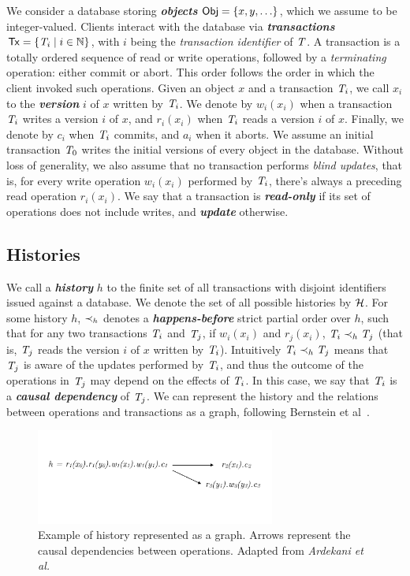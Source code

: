 We consider a database storing \textbf{\em objects} ${\sf Obj} = \{x, y, \ldots\}$, which we assume to be integer-valued. Clients interact with the database via \textbf{\em transactions} ${\sf Tx} = \{\mathit{T}_i \mid i \in \mathbb{N}\}$, with $i$ being the \emph{transaction identifier} of $\mathit{T}$. A transaction is a totally ordered sequence of read or write operations, followed by a \emph{terminating} operation: either commit or abort. This order follows the order in which the client invoked such operations. Given an object $x$ and a transaction $\mathit{T}_i$, we call $x_i$ to the \textbf{\em version} $i$ of $x$ written by $\mathit{T}_i$. We denote by $w_i(x_i)$ when a transaction $\mathit{T}_i$ writes a version $i$ of $x$, and $r_i(x_i)$ when $\mathit{T}_i$ reads a version $i$ of $x$. Finally, we denote by $c_i$ when $\mathit{T}_i$ commits, and $a_i$ when it aborts. We assume an initial transaction $\mathit{T}_0$ writes the initial versions of every object in the database. Without loss of generality, we also assume that no transaction performs \emph{blind updates}, that is, for every write operation $w_i(x_i)$ performed by $\mathit{T}_i$, there's always a preceding read operation $r_i(x_i)$. We say that a transaction is \textbf{\em read-only} if its set of operations does not include writes, and \textbf{\em update} otherwise.

\subsection{Histories}

We call a \textbf{\em history} $h$ to the finite set of all transactions with disjoint identifiers issued against a database. We denote the set of all possible histories by $\mathcal{H}$. For some history $h$, $\prec_h$ denotes a \textbf{\em happens-before} strict partial order over $h$, such that for any two transactions $\mathit{T}_i$ and $\mathit{T}_j$, if $w_i(x_i)$ and $r_j(x_i)$, $\mathit{T}_i \prec_h \mathit{T}_j$ (that is, $\mathit{T}_j$ reads the version $i$ of $x$ written by $\mathit{T}_i$). Intuitively $\mathit{T}_i \prec_h \mathit{T}_j$ means that $\mathit{T}_j$ is aware of the updates performed by $\mathit{T}_i$, and thus the outcome of the operations in $\mathit{T}_j$ may depend on the effects of $\mathit{T}_i$. In this case, we say that $\mathit{T}_i$ is a \textbf{\em causal dependency} of $\mathit{T}_j$. We can represent the history and the relations between operations and transactions as a graph, following Bernstein et al~\citep{bernstein_concurrency}.

\begin{figure}[h]
  \centering
  \vspace{-0.4cm}
  \includegraphics[width=0.7\textwidth]{figures/history.pdf}
  \vspace{-1cm}
  \caption{Example of history represented as a graph. Arrows represent the causal dependencies between operations. Adapted from \em{Ardekani et al.~\citep{ardekani-nsmi}}}
  \label{fig:history}
\end{figure}

